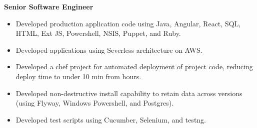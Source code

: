 \documentclass[12pt, line, margin]{res}
\begin{document}
\begin{resume}
            \textbf{Senior Software Engineer}
            \begin{itemize}  [nolistsep, noitemsep, topsep=0px, parsep=0px, partopsep=0px] %
              \item   Developed production application code using Java, Angular, \newline 
                          React, SQL, HTML, Ext JS, Powershell, NSIS, Puppet, and Ruby.
              \item   Developed applications using Severless architecture on AWS.
              \item   Developed a chef project for automated deployment of project \newline
                          code, reducing deploy time to under 10 min from hours.
              \item   Developed non-destructive install capability to retain data across\newline
                          versions (using Flyway, Windows Powershell, and Postgres).
              \item   Developed test scripts using Cucumber, Selenium, and testng.
            \end{itemize}



\end{resume}
\end{document}
